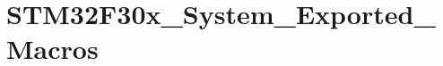 \hypertarget{group___s_t_m32_f30x___system___exported___macros}{\section{S\-T\-M32\-F30x\-\_\-\-System\-\_\-\-Exported\-\_\-\-Macros}
\label{group___s_t_m32_f30x___system___exported___macros}
}
